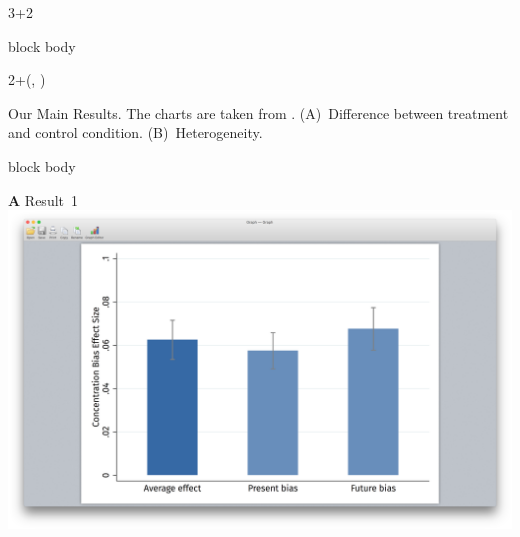 \documentclass{beamer}
\newlength{\blockTwo}
\begin{document}
\begin{frame}[t]
\begin{textblock*}{3\colwidth+2\colsep}
\begin{alertblock}
\begin{minipage}{0.475\textwidth}
\begin{beamercolorbox}[ht=29cm, center]{block body}
		\end{beamercolorbox}
	\end{minipage}
	\vspace{10pt}
\end{alertblock}

\end{textblock*}




\begin{textblock*}{2\colwidth+\colsep}(\leftmargin, \blockTwo)

\begin{alertblock}{%
	\begin{minipage}[b]{55pt}
		\RaggedRight
		\noindent{}
	\end{minipage}
	\begin{minipage}[b]{2\colwidth+\colsep-145pt}
		Our Main Results.\;
		{\mdseries The charts are taken from \cite{Dertwinkel-Kalt2017}.}\;
		(A)~{\mdseries Difference between treatment and control condition.}\;
		(B)~{\mdseries Heterogeneity.}
	\end{minipage}
}
\begin{beamercolorbox}[ht=8.0in, center]{block body}
	\begin{minipage}[t]{0.46\textwidth}
		\Large\textbf{A} \textcolor{SpotColor}{\hspace{3.75in} {\firasemibold\small Result~1}} \\[15pt]
		\includegraphics[width=9.13in, trim={3.75in 1.75in 3.75in 2in}, clip]
			{1_Example_Content/Images/average_pb_fb.png}
	\end{minipage}
	\hspace{20pt}
	\begin{minipage}[t]{0.46\textwidth}

\end{minipage}
\end{beamercolorbox}
\end{alertblock}
\end{textblock*}
\end{frame}
\end{document}
